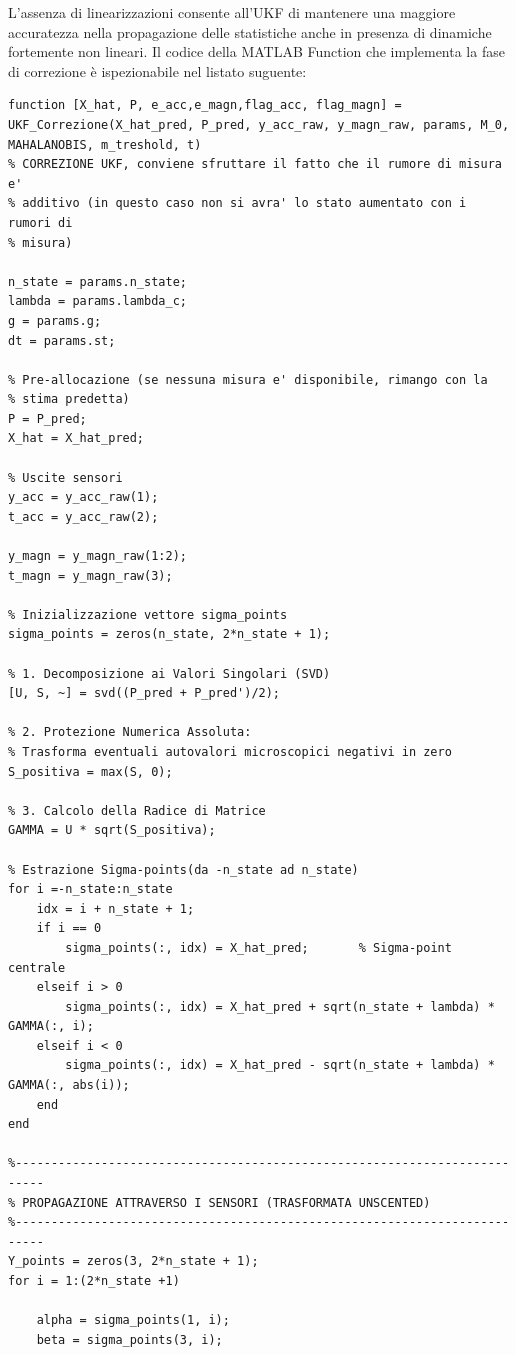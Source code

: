 \documentclass[12pt,a4paper]{article}
\begin{document}
L'assenza di linearizzazioni consente all'UKF di mantenere una maggiore accuratezza
nella propagazione delle statistiche anche in presenza di dinamiche fortemente non lineari.
Il codice della MATLAB Function che implementa la fase di correzione è ispezionabile nel listato suguente:
\newline
\begin{lstlisting}[style=matlabstyle, caption={Blocco di correzione dell'UKF}, label={lst:correzione_ukf}]
function [X_hat, P, e_acc,e_magn,flag_acc, flag_magn] = UKF_Correzione(X_hat_pred, P_pred, y_acc_raw, y_magn_raw, params, M_0, MAHALANOBIS, m_treshold, t)
% CORREZIONE UKF, conviene sfruttare il fatto che il rumore di misura e'
% additivo (in questo caso non si avra' lo stato aumentato con i rumori di
% misura)

n_state = params.n_state;
lambda = params.lambda_c;
g = params.g;
dt = params.st;

% Pre-allocazione (se nessuna misura e' disponibile, rimango con la
% stima predetta)
P = P_pred;
X_hat = X_hat_pred;

% Uscite sensori
y_acc = y_acc_raw(1);
t_acc = y_acc_raw(2);

y_magn = y_magn_raw(1:2);
t_magn = y_magn_raw(3);

% Inizializzazione vettore sigma_points
sigma_points = zeros(n_state, 2*n_state + 1);

% 1. Decomposizione ai Valori Singolari (SVD)
[U, S, ~] = svd((P_pred + P_pred')/2); 

% 2. Protezione Numerica Assoluta: 
% Trasforma eventuali autovalori microscopici negativi in zero
S_positiva = max(S, 0); 

% 3. Calcolo della Radice di Matrice
GAMMA = U * sqrt(S_positiva);

% Estrazione Sigma-points(da -n_state ad n_state)
for i =-n_state:n_state
    idx = i + n_state + 1;
    if i == 0      
        sigma_points(:, idx) = X_hat_pred;       % Sigma-point centrale
    elseif i > 0
        sigma_points(:, idx) = X_hat_pred + sqrt(n_state + lambda) * GAMMA(:, i);
    elseif i < 0
        sigma_points(:, idx) = X_hat_pred - sqrt(n_state + lambda) * GAMMA(:, abs(i));
    end
end

%--------------------------------------------------------------------------
% PROPAGAZIONE ATTRAVERSO I SENSORI (TRASFORMATA UNSCENTED)
%--------------------------------------------------------------------------
Y_points = zeros(3, 2*n_state + 1);
for i = 1:(2*n_state +1)

    alpha = sigma_points(1, i);
    beta = sigma_points(3, i);


\end{lstlisting}
\end{document}
